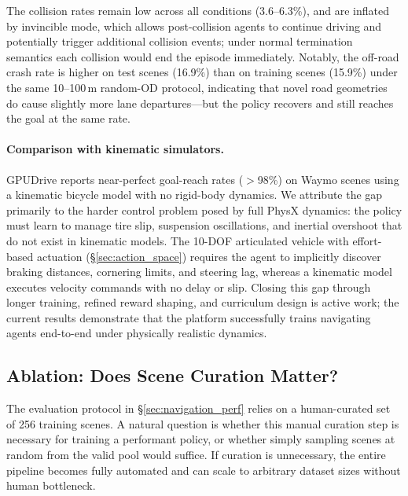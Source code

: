 The collision rates remain low across all conditions (3.6--6.3\%), and are inflated by invincible mode, which allows post-collision agents to continue driving and potentially trigger additional collision events; under normal termination semantics each collision would end the episode immediately.
Notably, the off-road crash rate is higher on test scenes (16.9\%) than on training scenes (15.9\%) under the same 10--100\,m random-OD protocol, indicating that novel road geometries do cause slightly more lane departures---but the policy recovers and still reaches the goal at the same rate.

\paragraph{Comparison with kinematic simulators.}
GPUDrive reports near-perfect goal-reach rates ($>$98\%) on Waymo scenes using a kinematic bicycle model with no rigid-body dynamics.
We attribute the gap primarily to the harder control problem posed by full PhysX dynamics: the policy must learn to manage tire slip, suspension oscillations, and inertial overshoot that do not exist in kinematic models.
The 10-DOF articulated vehicle with effort-based actuation (\S\ref{sec:action_space}) requires the agent to implicitly discover braking distances, cornering limits, and steering lag, whereas a kinematic model executes velocity commands with no delay or slip.
Closing this gap through longer training, refined reward shaping, and curriculum design is active work; the current results demonstrate that the platform successfully trains navigating agents end-to-end under physically realistic dynamics.




\subsection{Ablation: Does Scene Curation Matter?}
\label{sec:ablation_curation}

The evaluation protocol in \S\ref{sec:navigation_perf} relies on a human-curated set of 256 training scenes.
A natural question is whether this manual curation step is necessary for training a performant policy, or whether simply sampling scenes at random from the valid pool would suffice.
If curation is unnecessary, the entire pipeline becomes fully automated and can scale to arbitrary dataset sizes without human bottleneck.

